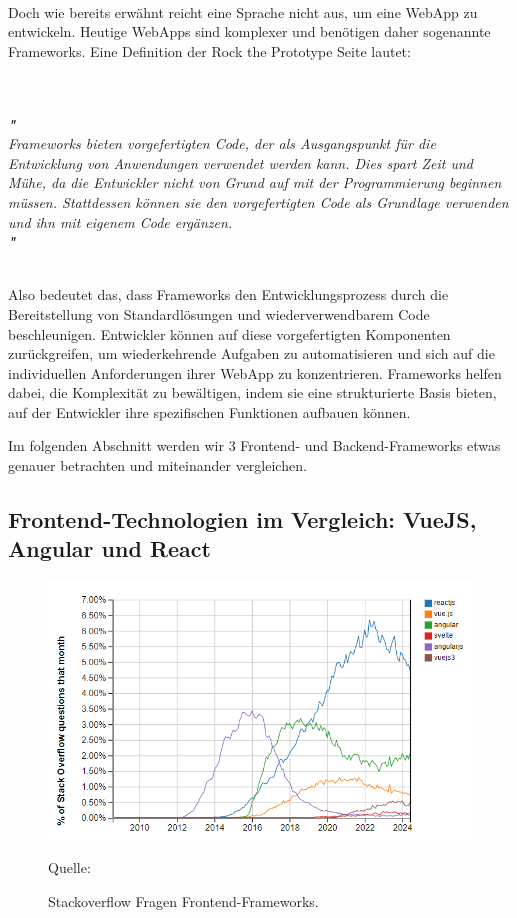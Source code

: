 \documentclass[biblatex]{lni}
\begin{document}
\\

Doch wie bereits erwähnt reicht eine Sprache nicht aus, um eine \ac{WebApp} zu entwickeln.
Heutige \ac{WebApp}s sind komplexer und benötigen daher sogenannte Frameworks.
Eine Definition der Rock the Prototype Seite lautet: \\
\begin{minipage}{\textwidth}
  \textit{
    \\
    \\
    \textbf{"} \\
    Frameworks bieten vorgefertigten Code,
    der als Ausgangspunkt für die Entwicklung von Anwendungen verwendet werden kann. Dies spart Zeit und Mühe,
    da die Entwickler nicht von Grund auf mit der Programmierung beginnen müssen.
    Stattdessen können sie den vorgefertigten Code als Grundlage verwenden und ihn mit eigenem Code ergänzen.
    \\
    \textbf{"} \\
    \Cite{RtP}
    \\
  }
\end{minipage}

Also bedeutet das,
dass Frameworks den Entwicklungsprozess durch die Bereitstellung von Standardlösungen und wiederverwendbarem Code beschleunigen.
Entwickler können auf diese vorgefertigten Komponenten zurückgreifen,
um wiederkehrende Aufgaben zu automatisieren und sich auf die individuellen Anforderungen ihrer \ac{WebApp} zu konzentrieren.
Frameworks helfen dabei, die Komplexität zu bewältigen,
indem sie eine strukturierte Basis bieten, auf der Entwickler ihre spezifischen Funktionen aufbauen können.

Im folgenden Abschnitt werden wir 3 Frontend- und Backend-Frameworks etwas genauer betrachten und miteinander vergleichen.

\subsection{Frontend-Technologien im Vergleich: VueJS, Angular und React}

\begin{figure}
  \centering
  \includegraphics[width=.8\textwidth]{fetrends}
  \caption{Stackoverflow Fragen Frontend-Frameworks.}
  \label{fig:fetrends}
  \vspace{-0.3cm}
  \begin{center}
    \footnotesize Quelle: \cite{SOTrend}
  \end{center}
\end{figure}
\end{document}
